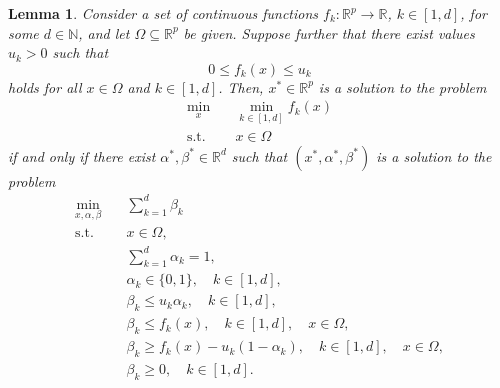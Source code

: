 \documentclass[a4paper,american,reqno]{amsart}
\newtheorem{lem}[thm]{Lemma}
\newcommand{\st}{\text{s.t.}}
\begin{document}
\begin{lem}
  \label{lemma2}
  Consider a set of continuous functions $f_k : \mathbb{R}^p \to
  \mathbb{R}$, $k \in [1,d]$, for some $d\in \mathbb{N}$, and let $\Omega
  \subseteq \mathbb{R}^p$ be given.
  Suppose further that there exist values $u_k>0$ such that $$0
  \leq f_k(x)\leq u_k$$ holds for all $x \in  \Omega$ and $k \in
  [1,d]$.
  Then, $x^*\in \mathbb{R}^p$ is a solution to the problem
  \begin{subequations} \label{problemmain}
    \begin{align}
      \min_{x} \quad
      & \min_{k \in [1,d]} f_k(x)
        \label{eq:problemmain1}\\
      \st \quad
      & x \in \Omega
        \label{eq:problemmain2}
    \end{align}
  \end{subequations}
  if and only if there exist $\alpha^*, \beta^* \in \mathbb{R}^d$ such
  that $(x^*, \alpha^*, \beta^*)$ is a solution to the problem
  \begin{subequations}
    \label{problembeta}
    \begin{align}
      \min_{ x,\alpha,\beta }
      & \quad \sum_{k=1}^d \beta_k
        \label{eq:beta1} \\
      \st
      & \quad x \in  \Omega,
        \label{eq:beta2}  \\
      & \quad  \sum_{k =1}^d \alpha_k = 1,
        \label{eq:beta3} \\
      &  \quad    \alpha_k \in \{0,1\}, \quad k \in[1,d],
        \label{eq:beta4}     \\
      &  \quad    \beta_k\leq u_k\alpha_k, \quad k \in[1,d],
        \label{eq:beta5}   \\
      &  \quad    \beta_k\leq f_k(x), \quad k \in[1,d], \quad x \in
        \Omega ,
        \label{eq:beta6}   \\
      &  \quad   \beta_k\geq f_k(x) - u_k(1-\alpha_k), \quad k
        \in[1,d], \quad x \in  \Omega,
        \label{eq:beta7}   \\
      &  \quad    \beta_k\geq 0, \quad k \in[1,d].
        \label{eq:beta8}
    \end{align}
  \end{subequations}
\end{lem}
\end{document}
